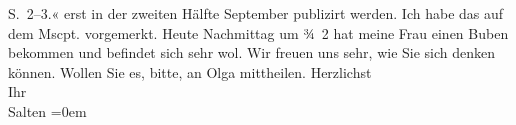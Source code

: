 \begin{ledgroupsized}[t]{13cm}
{{{                     S. 2–3.}}}\label{K_L03342-1h}« erst in der zweiten Hälfte September publizirt werden.
               Ich habe das auf dem Mscpt. vorgemerkt.\pend
           \pstart
           Heute Nachmittag um ¾ 2 hat meine Frau einen Buben bekommen und befindet sich sehr wol. Wir freuen uns
               sehr, wie Sie sich denken können. Wollen Sie es, bitte, an Olga mittheilen. \pend
           \pstart
           Herzlichst {\\[\baselineskip]}Ihr {\\[\baselineskip]}\spacefill\mbox{Salten}\pend
           \leftskip=0em{}
         
         \endnumbering{}\end{ledgroupsized}\begin{anhang}\end{anhang}\newcommand{\dateiname}{L03342}\newcommand{\titel}{Felix Salten an Arthur Schnitzler, 11. 8. 1903}\newcommand{\editorInnen}{Martin Anton Müller und Laura Untner}
      